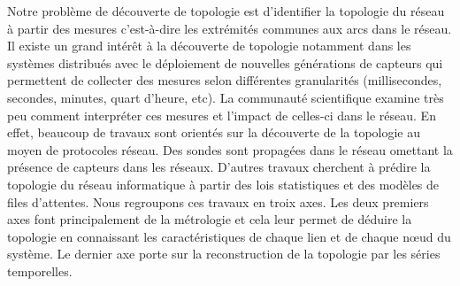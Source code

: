 Notre probl\`eme de d\'ecouverte de topologie est d'identifier la topologie du r\'eseau \`a partir des mesures c'est-\`a-dire les extr\'emit\'es communes aux arcs dans le r\'eseau.
\newline
Il existe un grand int\'er\^et \`a la d\'ecouverte de topologie notamment dans les syst\`emes distribu\'es avec le d\'eploiement de nouvelles g\'en\'erations de capteurs qui permettent de collecter des mesures selon diff\'erentes granularit\'es (millisecondes, secondes, minutes, quart d'heure, etc).
La communaut\'e scientifique examine tr\`es peu comment interpr\'eter ces mesures et l'impact de celles-ci dans le r\'eseau.
En effet, beaucoup de travaux sont orient\'es sur la d\'ecouverte de la topologie au moyen de protocoles r\'eseau. Des sondes sont propag\'ees dans le r\'eseau omettant la pr\'esence de capteurs dans les r\'eseaux. D'autres travaux cherchent \`a pr\'edire la topologie du r\'eseau informatique \`a partir des lois statistiques et des mod\`eles de files d'attentes.
\newline
Nous regroupons ces travaux en troix axes.
Les deux premiers axes font principalement de la m\'etrologie et cela leur permet de d\'eduire la topologie en connaissant les caract\'eristiques de chaque lien et de chaque n\oe ud du syst\`eme.
Le dernier axe porte sur la reconstruction de la topologie par les s\'eries temporelles.

